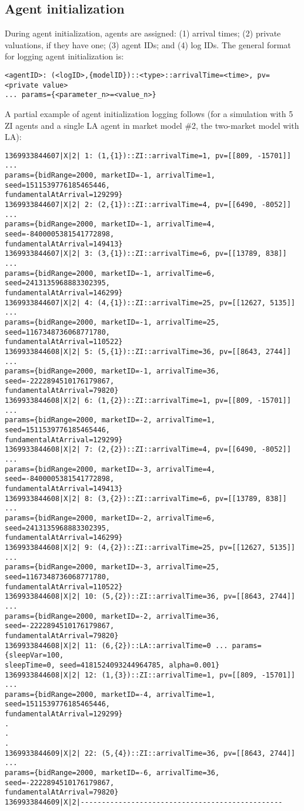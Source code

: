 \documentclass[11pt]{article}
\begin{document}
\subsection{Agent initialization}
During agent initialization, agents are assigned: (1) arrival times; (2) private valuations, if they have one; (3) agent IDs; and (4) log IDs.
The general format for logging agent initialization is:
\begin{verbatim}
<agentID>: (<logID>,{modelID})::<type>::arrivalTime=<time>, pv=<private value>
... params={<parameter_n>=<value_n>}
\end{verbatim}
A partial example of agent initialization logging follows (for a simulation with 5 ZI agents and a single LA agent in market model \#2, the two-market model with LA):
\begin{verbatim}
1369933844607|X|2| 1: (1,{1})::ZI::arrivalTime=1, pv=[[809, -15701]] ... 
params={bidRange=2000, marketID=-1, arrivalTime=1, seed=1511539776185465446, 
fundamentalAtArrival=129299}
1369933844607|X|2| 2: (2,{1})::ZI::arrivalTime=4, pv=[[6490, -8052]] ... 
params={bidRange=2000, marketID=-1, arrivalTime=4, seed=-8400005381541772898, 
fundamentalAtArrival=149413}
1369933844607|X|2| 3: (3,{1})::ZI::arrivalTime=6, pv=[[13789, 838]] ... 
params={bidRange=2000, marketID=-1, arrivalTime=6, seed=2413135968883302395, 
fundamentalAtArrival=146299}
1369933844607|X|2| 4: (4,{1})::ZI::arrivalTime=25, pv=[[12627, 5135]] ... 
params={bidRange=2000, marketID=-1, arrivalTime=25, seed=1167348736068771780, 
fundamentalAtArrival=110522}
1369933844608|X|2| 5: (5,{1})::ZI::arrivalTime=36, pv=[[8643, 2744]] ... 
params={bidRange=2000, marketID=-1, arrivalTime=36, seed=-2222894510176179867, 
fundamentalAtArrival=79820}
1369933844608|X|2| 6: (1,{2})::ZI::arrivalTime=1, pv=[[809, -15701]] ... 
params={bidRange=2000, marketID=-2, arrivalTime=1, seed=1511539776185465446, 
fundamentalAtArrival=129299}
1369933844608|X|2| 7: (2,{2})::ZI::arrivalTime=4, pv=[[6490, -8052]] ... 
params={bidRange=2000, marketID=-3, arrivalTime=4, seed=-8400005381541772898, 
fundamentalAtArrival=149413}
1369933844608|X|2| 8: (3,{2})::ZI::arrivalTime=6, pv=[[13789, 838]] ... 
params={bidRange=2000, marketID=-2, arrivalTime=6, seed=2413135968883302395, 
fundamentalAtArrival=146299}
1369933844608|X|2| 9: (4,{2})::ZI::arrivalTime=25, pv=[[12627, 5135]] ... 
params={bidRange=2000, marketID=-3, arrivalTime=25, seed=1167348736068771780, 
fundamentalAtArrival=110522}
1369933844608|X|2| 10: (5,{2})::ZI::arrivalTime=36, pv=[[8643, 2744]] ... 
params={bidRange=2000, marketID=-2, arrivalTime=36, seed=-2222894510176179867, 
fundamentalAtArrival=79820}
1369933844608|X|2| 11: (6,{2})::LA::arrivalTime=0 ... params={sleepVar=100, 
sleepTime=0, seed=4181524093244964785, alpha=0.001}
1369933844608|X|2| 12: (1,{3})::ZI::arrivalTime=1, pv=[[809, -15701]] ... 
params={bidRange=2000, marketID=-4, arrivalTime=1, seed=1511539776185465446, 
fundamentalAtArrival=129299}
.
.
.
1369933844609|X|2| 22: (5,{4})::ZI::arrivalTime=36, pv=[[8643, 2744]] ... 
params={bidRange=2000, marketID=-6, arrivalTime=36, seed=-2222894510176179867, 
fundamentalAtArrival=79820}
1369933844609|X|2|------------------------------------------------
\end{verbatim}
\end{document}
